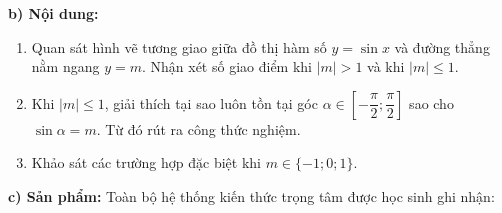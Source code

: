 \documentclass[12pt, a4paper]{article}
\begin{document}
\noindent \textbf{b) Nội dung:}  
\begin{enumerate}[leftmargin=0.6cm]  
    \item Quan sát hình vẽ tương giao giữa đồ thị hàm số $y = \sin x$ và đường thẳng nằm ngang $y = m$. Nhận xét số giao điểm khi $|m| > 1$ và khi $|m| \le 1$.  
    \item Khi $|m| \le 1$, giải thích tại sao luôn tồn tại góc $\alpha \in \left[-\dfrac{\pi}{2}; \dfrac{\pi}{2}\right]$ sao cho $\sin\alpha = m$. Từ đó rút ra công thức nghiệm.  
    \item Khảo sát các trường hợp đặc biệt khi $m \in \{-1; 0; 1\}$.  
\end{enumerate}  
  
\noindent \textbf{c) Sản phẩm:}  
Toàn bộ hệ thống kiến thức trọng tâm được học sinh ghi nhận:  
  
\end{document}
